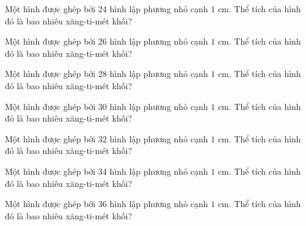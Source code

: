 \begin{ex}
  Một hình được ghép bởi 24 hình lập phương nhỏ cạnh $1\text{ cm}$. Thể tích của hình đó là bao nhiêu xăng-ti-mét khối?
\end{ex}

\begin{ex}
  Một hình được ghép bởi 26 hình lập phương nhỏ cạnh $1\text{ cm}$. Thể tích của hình đó là bao nhiêu xăng-ti-mét khối?
\end{ex}

\begin{ex}
  Một hình được ghép bởi 28 hình lập phương nhỏ cạnh $1\text{ cm}$. Thể tích của hình đó là bao nhiêu xăng-ti-mét khối?
\end{ex}

\begin{ex}
  Một hình được ghép bởi 30 hình lập phương nhỏ cạnh $1\text{ cm}$. Thể tích của hình đó là bao nhiêu xăng-ti-mét khối?
\end{ex}

\begin{ex}
  Một hình được ghép bởi 32 hình lập phương nhỏ cạnh $1\text{ cm}$. Thể tích của hình đó là bao nhiêu xăng-ti-mét khối?
\end{ex}

\begin{ex}
  Một hình được ghép bởi 34 hình lập phương nhỏ cạnh $1\text{ cm}$. Thể tích của hình đó là bao nhiêu xăng-ti-mét khối?
\end{ex}

\begin{ex}
  Một hình được ghép bởi 36 hình lập phương nhỏ cạnh $1\text{ cm}$. Thể tích của hình đó là bao nhiêu xăng-ti-mét khối?
\end{ex}

